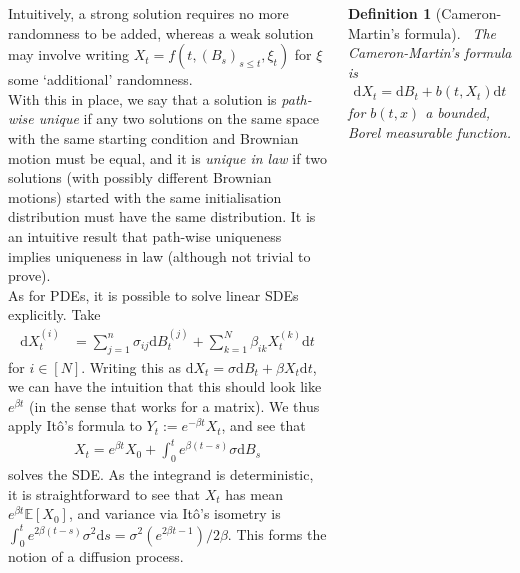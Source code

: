 \documentclass{tikzposter} %
\newcommand{\diff}{\mathrm{d}}
\newcommand\E[1]{\mathbb{E}\left[ #1 \right]}
\newtheorem{definition}{Definition}
\begin{document}
\begin{columns}
{    Intuitively, a strong solution requires no more randomness to be added, whereas a weak solution may involve writing $X_t = f(t, (B_s)_{s \le t}, \xi_t)$ for $\xi$ some `additional' randomness. \\

    With this in place, we say that a solution is \emph{path-wise unique} if any two solutions on the same space with the same starting condition and Brownian motion must be equal, and it is \emph{unique in law} if two solutions (with possibly different Brownian motions) started with the same initialisation distribution must have the same distribution. It is an intuitive result that path-wise uniqueness implies uniqueness in law (although not trivial to prove). \\

    As for PDEs, it is possible to solve linear SDEs explicitly. Take
    \begin{align*}
      \diff X^{(i)}_t &= \sum_{j = 1}^n \sigma_{ij} \diff B_t^{(j)} + \sum_{k = 1}^N \beta_{ik} X_t^{(k)} \diff t
    \end{align*}
    for $i \in [N]$. Writing this as $\diff X_t = \sigma \diff B_t + \beta X_t \diff t$, we can have the intuition that this should look like $e^{\beta t}$ (in the sense that works for a matrix). We thus apply It\^o's formula to $Y_t := e^{-\beta t} X_t$, and see that
    \begin{align*}
      X_t = e^{\beta t} X_0 + \int_0^t e^{\beta (t-s)} \sigma \diff B_s
    \end{align*}
    solves the SDE. As the integrand is deterministic, it is straightforward to see that $X_t$ has mean $e^{\beta t} \E{X_0}$, and variance via It\^o's isometry is $\int_0^t e^{2\beta(t-s)} \sigma^2 \diff s = \sigma^2 (e^{2\beta t - 1})/2\beta$. This forms the notion of a diffusion process. \\

    \begin{definition}[Cameron-Martin's formula]
    \ The Cameron-Martin's formula is
    \begin{align*}
      \diff X_t = \diff B_t + b(t, X_t) \diff t
    \end{align*}
    for $b(t, x)$ a bounded, Borel measurable function.
    \end{definition}
    \hphantom{}

}
\end{columns}
\end{document}
